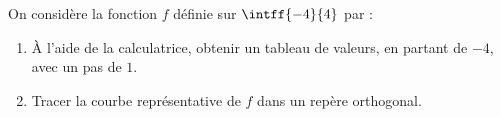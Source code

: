 \begin{exo}{}
	On considère la fonction $f$ définie sur $\intff{-4}{4}$ par : 
	\begin{enumerate}
		\item À l'aide de la calculatrice, obtenir un tableau de valeurs, en partant de $-4$, avec un pas de $1$.
		\item Tracer la courbe représentative de $f$ dans un repère orthogonal.
	\end{enumerate}
\end{exo}
